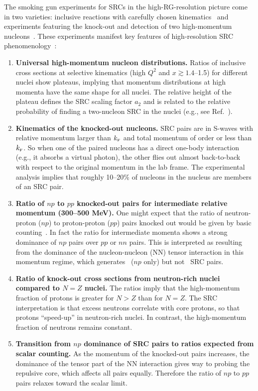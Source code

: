 \documentclass[10pt,aps,prc,floatfix,twocolumn,nofootinbib]{revtex4-1}
\begin{document}
The smoking gun experiments for SRCs in the high-RG-resolution picture come in two varieties: inclusive reactions with carefully chosen kinematics~\cite{Egiyan:2003vg,Egiyan:2005hs,Fomin:2011ng,Ye:2017mvo,Nguyen:2020mgo} and experiments featuring the knock-out and detection of two high-momentum nucleons~\cite{Hen:2014nza,Higinbotham:2014xna,Korover:2014dma,Duer:2018sxh,Duer:2018sby,Schmookler:2019nvf,Schmidt:2020kcl}.
These experiments manifest key features of high-resolution SRC phenomenology~\cite{Hen:2016kwk}:
\begin{enumerate}
  \item \textbf{Universal high-momentum nucleon distributions.}
  Ratios of inclusive cross sections at selective kinematics (high $Q^2$ and $x \gtrsim 1.4$--1.5) for different nuclei show plateaus, implying that momentum distributions at high momenta have the same shape for all nuclei.
  The relative height of the plateau defines the SRC scaling factor $a_2$ and is related to the relative probability of finding a two-nucleon SRC in the nuclei (e.g., see Ref.~\cite{Ryckebusch:2019oya}).
  
  
   \item \textbf{Kinematics of the knocked-out nucleons.}
   SRC pairs are in S-waves with relative momentum larger than $k_{\scriptscriptstyle{\text F}}$ and total momentum of order or less than $k_{\scriptscriptstyle{\text F}}$.
   So when one of the paired nucleons has a direct one-body interaction (e.g., it absorbs a virtual photon), the other flies out almost back-to-back with respect to the original momentum in the lab frame.
   The experimental analysis implies that roughly 10--20\% of nucleons in the nucleus are members of an SRC pair.
   
  \item \textbf{Ratio of $np$ to $pp$ knocked-out pairs for intermediate relative momentum (300--500 MeV).}
  One might expect that the ratio of neutron-proton ($np$) to proton-proton ($pp$) pairs knocked out would be given by basic counting~\cite{Colle:2015ena}.
  In fact the ratio for intermediate momenta shows a strong dominance of $np$ pairs over $pp$ or $nn$ pairs.
  This is interpreted as resulting from the dominance of the nucleon-nucleon (NN) tensor interaction in this momentum regime, which generates \tripletS\ ($np$ only) but not \singletS\ SRC pairs.
  
   \item \textbf{Ratio of knock-out cross sections from neutron-rich nuclei compared to $N=Z$ nuclei.}
   The ratios imply that the high-momentum fraction of protons is greater for $N>Z$ than for $N=Z$.
   The SRC interpretation is that excess neutrons correlate with core protons, so that protons ``speed-up'' in neutron-rich nuclei.
   In contrast, the high-momentum fraction of neutrons remains constant.
   
  \item \textbf{Transition from $np$ dominance of SRC pairs to ratios expected from scalar counting.}
  As the momentum of the knocked-out pairs increases, the dominance of the tensor part of the NN interaction gives way to probing the repulsive core, which affects all pairs equally.
  Therefore the ratio of $np$ to $pp$ pairs relaxes toward the scalar limit.
  
\end{enumerate}
\end{document}
